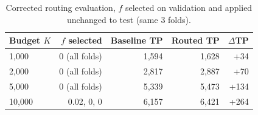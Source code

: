 \begin{table}[t]
\centering
\caption{Corrected routing evaluation, $f$ selected on validation and applied unchanged to test (same 3 folds).}
\label{tab:route_valid}
\begin{tabular}{lrrrr}
\toprule
Budget $K$ & $f$ selected & Baseline TP & Routed TP & $\Delta$TP \\
\midrule
1,000 & 0 (all folds) & 1,594 & 1,628 & +34 \\
2,000 & 0 (all folds) & 2,817 & 2,887 & +70 \\
5,000 & 0 (all folds) & 5,339 & 5,473 & +134 \\
10,000 & 0.02, 0, 0 & 6,157 & 6,421 & +264 \\
\bottomrule
\end{tabular}
\end{table}
